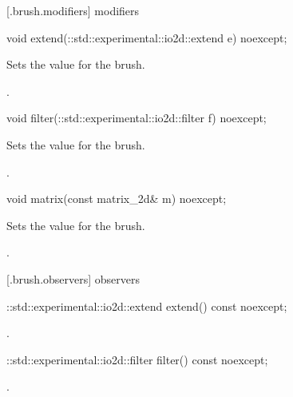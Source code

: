  [\iotwod.brush.modifiers]{ modifiers}

\begin{itemdecl}
    void extend(::std::experimental::io2d::extend e) noexcept;
\end{itemdecl}
\begin{itemdescr}
	\pnum
	\effects
	Sets the  value for the brush.
	
	\pnum
	\postconditions
	.
	
\end{itemdescr}

\begin{itemdecl}
    void filter(::std::experimental::io2d::filter f) noexcept;
\end{itemdecl}
\begin{itemdescr}
	\pnum
	\effects
	Sets the  value for the brush.
	
	\pnum
	\postconditions
	.
	
\end{itemdescr}

\begin{itemdecl}
    void matrix(const matrix_2d& m) noexcept;
\end{itemdecl}
\begin{itemdescr}
	\pnum
	\effects
	Sets the  value for the brush.
	
	\pnum
	\postconditions
	.
	
\end{itemdescr}

 [\iotwod.brush.observers]{ observers}

\begin{itemdecl}
    ::std::experimental::io2d::extend extend() const noexcept;
\end{itemdecl}
\begin{itemdescr}
	\pnum
	\returns
	.

\end{itemdescr}

\begin{itemdecl}
    ::std::experimental::io2d::filter filter() const noexcept;
\end{itemdecl}
\begin{itemdescr}
	\pnum
	\returns
	.

\end{itemdescr}

